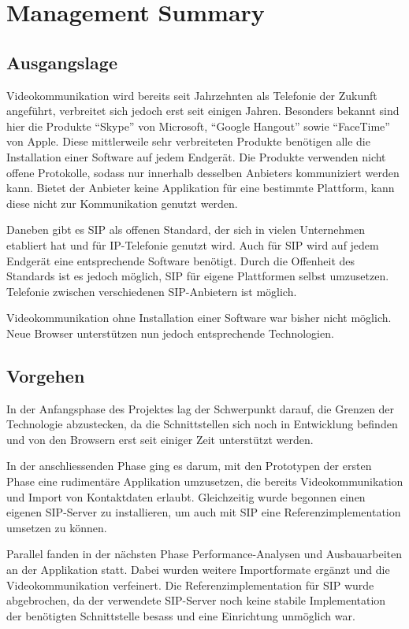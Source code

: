 \chapter{Management Summary}

\section{Ausgangslage}
Videokommunikation wird bereits seit Jahrzehnten als Telefonie der Zukunft angeführt, verbreitet sich jedoch erst seit einigen Jahren. 
Besonders bekannt sind hier die Produkte "`Skype"' von Microsoft,
"`Google Hangout"' sowie "`FaceTime"' von Apple.
Diese mittlerweile sehr verbreiteten Produkte benötigen alle die Installation
einer Software auf jedem Endgerät. Die Produkte verwenden nicht offene
Protokolle, sodass nur innerhalb desselben Anbieters kommuniziert werden
kann.
Bietet der Anbieter keine Applikation für eine bestimmte Plattform, kann diese
nicht zur Kommunikation genutzt werden.

Daneben gibt es SIP als offenen Standard, der sich in vielen Unternehmen
etabliert hat und für IP-Telefonie genutzt wird. Auch für SIP wird auf jedem
Endgerät eine entsprechende Software benötigt. Durch die Offenheit des Standards
ist es jedoch möglich, SIP für eigene Plattformen selbst umzusetzen. Telefonie
zwischen verschiedenen SIP-Anbietern ist möglich.

Videokommunikation ohne Installation einer Software war bisher nicht möglich. Neue Browser unterstützen nun jedoch entsprechende Technologien.


\section{Vorgehen}
In der Anfangsphase des Projektes lag der Schwerpunkt darauf, die Grenzen der Technologie abzustecken, da die Schnittstellen sich noch in Entwicklung befinden und von den Browsern erst seit einiger Zeit unterstützt werden.

In der anschliessenden Phase ging es darum, mit den Prototypen der ersten Phase
eine rudimentäre Applikation umzusetzen, die bereits Videokommunikation und
Import von Kontaktdaten erlaubt. Gleichzeitig wurde begonnen einen eigenen SIP-Server zu installieren, um auch mit SIP eine Referenzimplementation umsetzen zu können.

Parallel fanden in der nächsten Phase Performance-Analysen und Ausbauarbeiten an der Applikation statt. Dabei wurden weitere Importformate ergänzt und die Videokommunikation verfeinert.
Die Referenzimplementation für SIP wurde abgebrochen, da der verwendete SIP-Server noch keine stabile Implementation der benötigten Schnittstelle besass und eine Einrichtung unmöglich war.

